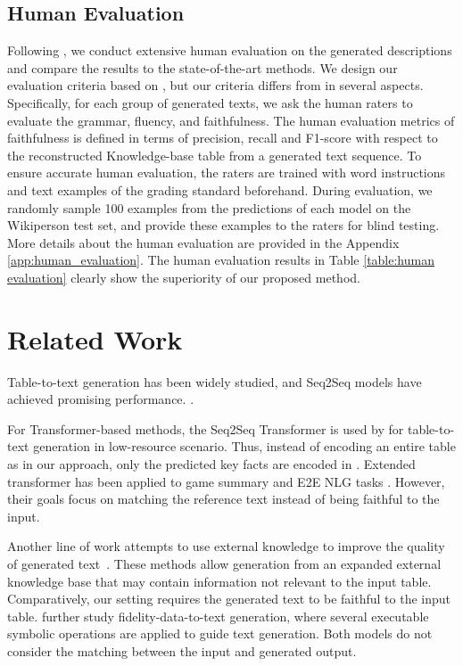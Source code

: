 \documentclass[11pt,a4paper]{article}
\begin{document}
\subsection{Human Evaluation}
Following \cite{Wang2018, tian2019}, we conduct extensive human evaluation on the generated descriptions and compare the results to the state-of-the-art methods. We design our evaluation criteria based on \cite{Wang2018, tian2019}, but our criteria differs from \cite{tian2019} in several aspects. Specifically, for each group of generated texts, we ask the human raters to evaluate the grammar, fluency, and faithfulness. The human evaluation metrics of faithfulness is defined in terms of precision, recall and F1-score with respect to the reconstructed Knowledge-base table from a generated text sequence. To ensure accurate human evaluation, the raters are trained with word instructions and text examples of the grading standard beforehand. During evaluation, we randomly sample 100 examples from the predictions of each model on the Wikiperson test set, and provide these examples to the raters for blind testing. More details about the human evaluation are provided in the Appendix \ref{app:human_evaluation}. The human evaluation results in Table \ref{table:human evaluation} clearly show the superiority of our proposed method.



\section{Related Work}
Table-to-text generation has been widely studied, and Seq2Seq models have achieved promising performance. \cite{Wikiemnlp2016,structure2018,Wiseman2018,Ma2019,Wang2018,tianyu2019}. 

For Transformer-based methods, the Seq2Seq Transformer is used by \citet{Ma2019} for table-to-text generation in low-resource scenario. Thus, instead of encoding an entire table as in our approach, only the predicted key facts are encoded in \cite{Ma2019}. Extended transformer has been applied to game summary \cite{gong2019} and E2E NLG tasks \cite{Gehrmann2018}. However, their goals focus on matching the reference text instead of being faithful to the input. 

Another line of work attempts to use external knowledge to improve the quality of generated text~\cite{chen2019}. These methods allow generation from an expanded external knowledge base that may contain information not relevant to the input table. Comparatively, our setting requires the generated text to be faithful to the input table. \citet{Nie2018} further study fidelity-data-to-text generation, where several executable symbolic operations are applied
to guide text generation. Both models do not consider the matching between the input and generated output.
\end{document}
